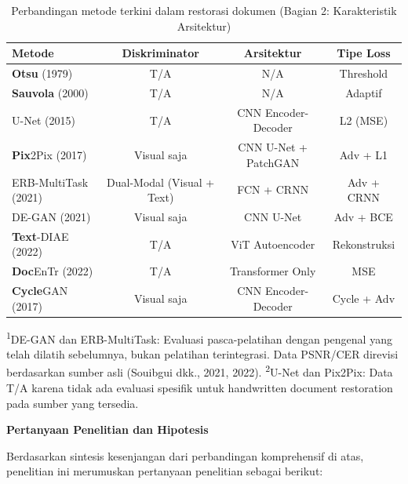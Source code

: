 \documentclass[12pt,a4paper]{article}
\begin{document}
\begin{table}[H]
\centering
\caption{Perbandingan metode terkini dalam restorasi dokumen (Bagian 2: Karakteristik Arsitektur)}
\label{tab:sota-comparison-arch}
\footnotesize
\begin{tabular}{|l|c|c|c|}
\hline
\textbf{Metode} & \textbf{Diskriminator} & \textbf{Arsitektur} & \textbf{Tipe Loss} \\ \hline
\textbf{Otsu} (1979) & T/A & N/A & Threshold \\ \hline
\textbf{Sauvola} (2000) & T/A & N/A & Adaptif \\ \hline
U-Net (2015) & T/A & CNN Encoder-Decoder & L2 (MSE) \\ \hline
\textbf{Pix}2Pix (2017) & Visual saja & CNN U-Net + PatchGAN & Adv + L1 \\ \hline
ERB-MultiTask (2021) & Dual-Modal (Visual + Text) & FCN + CRNN & Adv + CRNN \\ \hline
DE-GAN (2021) & Visual saja & CNN U-Net & Adv + BCE \\ \hline
\textbf{Text}-DIAE (2022) & T/A & ViT Autoencoder & Rekonstruksi \\ \hline
\textbf{Doc}EnTr (2022) & T/A & Transformer Only & MSE \\ \hline
\textbf{Cycle}GAN (2017) & Visual saja & CNN Encoder-Decoder & Cycle + Adv \\ \hline
\end{tabular}
\end{table}


{\footnotesize\textsuperscript{1}DE-GAN dan ERB-MultiTask: Evaluasi pasca-pelatihan dengan pengenal yang telah dilatih sebelumnya, bukan pelatihan terintegrasi. Data PSNR/CER direvisi berdasarkan sumber asli (Souibgui dkk., 2021, 2022).
\textsuperscript{2}U-Net dan Pix2Pix: Data T/A karena tidak ada evaluasi spesifik untuk handwritten document restoration pada sumber yang tersedia.}

\vspace{1ex}
\noindent\textbf{Pertanyaan Penelitian dan Hipotesis}

\vspace{0.5ex}
Berdasarkan sintesis kesenjangan dari perbandingan komprehensif di atas, penelitian ini merumuskan pertanyaan penelitian sebagai berikut:
\end{document}

